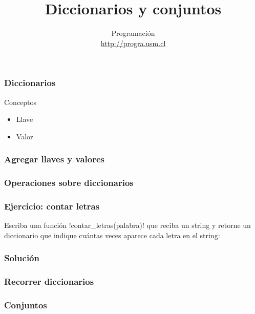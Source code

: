\documentclass[12pt]{beamer}
\title{Diccionarios y conjuntos}
\author{
  Programación \\ \url{http://progra.usm.cl}
}
\date{}
\begin{document}
  \begin{frame}
    \maketitle
  \end{frame}

  \begin{frame}
    \frametitle{Diccionarios}
    \label{dicc-telefonos}
    
    \begin{block}{Conceptos}
      \begin{itemize}
        \item Llave
        \item Valor
      \end{itemize}
    \end{block}
  \end{frame}

  \begin{frame}
    \frametitle{Agregar llaves y valores}
    \label{dicc-agregar}
    
  \end{frame}

  \begin{frame}
    \frametitle{Operaciones sobre diccionarios}
    \label{dicc-operaciones}
    \footnotesize
    
  \end{frame}

  \begin{frame}
    \frametitle{Ejercicio: contar letras}
    \label{ejercicio-contar-letras}
    Escriba una función \li!contar_letras(palabra)!
    que reciba un string y retorne un diccionario
    que indique cuántas veces aparece cada letra en el string:
    
  \end{frame}

  \begin{frame}
    \frametitle{Solución}
    \label{solucion-contar-letras}
    
  \end{frame}

  \begin{frame}
    \frametitle{Recorrer diccionarios}
    \label{recorrer-diccionarios}
    \footnotesize
    
  \end{frame}

  \begin{frame}
    \frametitle{Conjuntos}
    \label{conjuntos-crear}
    
  \end{frame}
\end{document}
